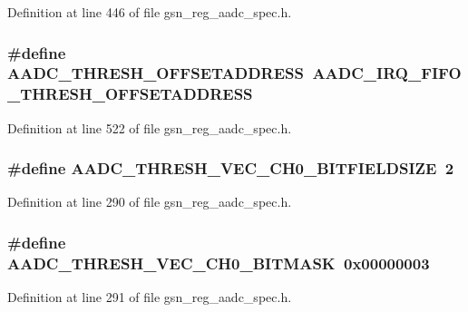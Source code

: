 Definition at line 446 of file gsn\_\-reg\_\-aadc\_\-spec.h.

\hypertarget{a00543_a6c6862ba38bde70a73886da0d6b11da2}{
\subsubsection[{AADC\_\-THRESH\_\-OFFSETADDRESS}]{\setlength{\rightskip}{0pt plus 5cm}\#define AADC\_\-THRESH\_\-OFFSETADDRESS~AADC\_\-IRQ\_\-FIFO\_\-THRESH\_\-OFFSETADDRESS}}
\label{a00543_a6c6862ba38bde70a73886da0d6b11da2}


Definition at line 522 of file gsn\_\-reg\_\-aadc\_\-spec.h.

\hypertarget{a00543_a02e9913e7904419cd930d814cd8908c5}{
\subsubsection[{AADC\_\-THRESH\_\-VEC\_\-CH0\_\-BITFIELDSIZE}]{\setlength{\rightskip}{0pt plus 5cm}\#define AADC\_\-THRESH\_\-VEC\_\-CH0\_\-BITFIELDSIZE~2}}
\label{a00543_a02e9913e7904419cd930d814cd8908c5}


Definition at line 290 of file gsn\_\-reg\_\-aadc\_\-spec.h.

\hypertarget{a00543_af95b9a4a3e0d9d4d0e82150aa280d607}{
\subsubsection[{AADC\_\-THRESH\_\-VEC\_\-CH0\_\-BITMASK}]{\setlength{\rightskip}{0pt plus 5cm}\#define AADC\_\-THRESH\_\-VEC\_\-CH0\_\-BITMASK~0x00000003}}
\label{a00543_af95b9a4a3e0d9d4d0e82150aa280d607}


Definition at line 291 of file gsn\_\-reg\_\-aadc\_\-spec.h.

